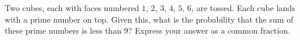 Two cubes, each with faces numbered $1$, $2$, $3$, $4$, $5$, $6$, are tossed. Each cube lands with a prime number on top. Given this, what is the probability that the sum of these prime numbers is less than $9$? Express your answer as a common fraction.
